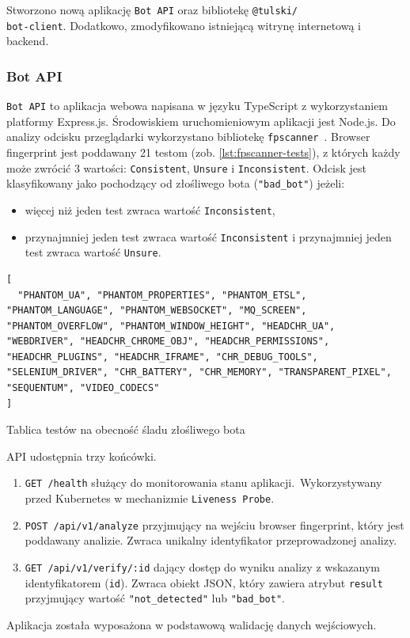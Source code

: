 Stworzono nową aplikację \texttt{Bot API} oraz bibliotekę \texttt{@tulski/\\bot-client}.
Dodatkowo, zmodyfikowano istniejącą witrynę internetową i backend.

\subsubsection{Bot API}

\texttt{Bot API} to aplikacja webowa napisana w języku TypeScript z wykorzystaniem platformy Express.js.
Środowiskiem uruchomieniowym aplikacji jest Node.js.
Do analizy odcisku przeglądarki wykorzystano bibliotekę \texttt{fpscanner}~\cite{github-fpscanner}.
Browser fingerprint jest poddawany 21 testom (zob. \autoref{lst:fpscanner-tests}), z których każdy
może zwrócić 3 wartości: \texttt{Consistent}, \texttt{Unsure} i \texttt{Inconsistent}.
Odcisk jest klasyfikowany jako pochodzący od złośliwego bota (\texttt{"bad\_bot"}) jeżeli:
\begin{itemize}
    \item więcej niż jeden test zwraca wartość \texttt{Inconsistent},
    \item przynajmniej jeden test zwraca wartość \texttt{Inconsistent} i przynajmniej jeden test zwraca wartość \texttt{Unsure}.
\end{itemize}

\begin{listing}[H]
    \begin{verbatim}
[
  "PHANTOM_UA", "PHANTOM_PROPERTIES", "PHANTOM_ETSL", "PHANTOM_LANGUAGE", "PHANTOM_WEBSOCKET", "MQ_SCREEN", "PHANTOM_OVERFLOW", "PHANTOM_WINDOW_HEIGHT", "HEADCHR_UA", "WEBDRIVER", "HEADCHR_CHROME_OBJ", "HEADCHR_PERMISSIONS", "HEADCHR_PLUGINS", "HEADCHR_IFRAME", "CHR_DEBUG_TOOLS", "SELENIUM_DRIVER", "CHR_BATTERY", "CHR_MEMORY", "TRANSPARENT_PIXEL", "SEQUENTUM", "VIDEO_CODECS"
]
    \end{verbatim}
    \caption{Tablica testów na obecność śladu złośliwego bota}
    \label{lst:fpscanner-tests}
\end{listing}


\noindent API udostępnia trzy końcówki.
\begin{enumerate}
    \item \texttt{GET /health} służący do monitorowania stanu aplikacji.\ Wykorzystywany przed Kubernetes w mechanizmie \texttt{Liveness Probe}.
    \item \texttt{POST /api/v1/analyze} przyjmujący na wejściu browser fingerprint, który jest poddawany analizie.
    Zwraca unikalny identyfikator przeprowadzonej analizy.
    \item \texttt{GET /api/v1/verify/:id} dający dostęp do wyniku analizy z wskazanym identyfikatorem (\texttt{id}).
    Zwraca obiekt JSON, który zawiera atrybut \texttt{result} przyjmujący wartość \texttt{"not\_detected"} lub \texttt{"bad\_bot"}.

\end{enumerate}
\noindent Aplikacja została wyposażona w podstawową walidację danych wejściowych.

